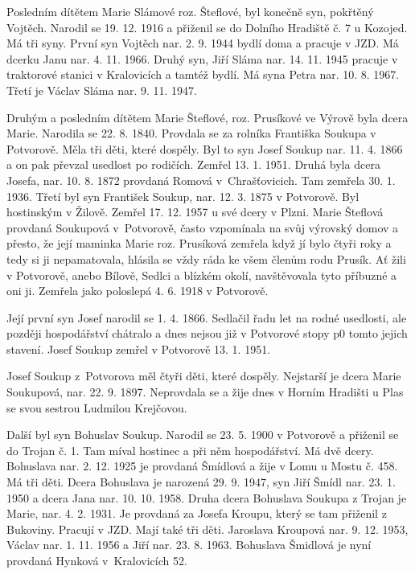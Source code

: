 \documentclass[../dejiny-rodu-prusiku.tex]{subfiles}
\begin{document}
Posledním dítětem Marie Slámové roz. Šteflové, byl konečně syn, pokřtěný Vojtěch. Narodil se 19. 12. 1916 a přiženil se do Dolního Hradiště č. 7 u Kozojed. Má tři syny. První syn Vojtěch nar. 2. 9. 1944 bydlí doma a pracuje v JZD. Má dcerku Janu nar. 4. 11. 1966. Druhý syn, Jiří Sláma nar. 14. 11. 1945 pracuje v traktorové stanici v Kralovicích a tamtéž bydlí. Má syna Petra nar. 10. 8. 1967. Třetí je Václav Sláma nar. 9. 11. 1947.

Druhým a posledním dítětem Marie Šteflové, roz. Prusíkové ve Výrově byla dcera Marie. Narodila se 22. 8. 1840. Provdala se za rolníka Františka Soukupa v Potvorově. Měla tři děti, které dospěly. Byl to syn Josef Soukup nar. 11. 4. 1866 a on pak převzal usedlost po rodičích. Zemřel 13. 1. 1951. Druhá byla dcera Josefa, nar. 10. 8. 1872 provdaná Romová v Chrašťovicich. Tam zemřela 30. 1. 1936. Třetí byl syn František Soukup, nar. 12. 3. 1875 v Potvorově. Byl hostinským v Žilově. Zemřel 17. 12. 1957 u své dcery v Plzni. Marie Šteflová provdaná Soukupová v Potvorově, často vzpomínala na svůj výrovský domov a přesto, že její maminka Marie roz. Prusíková zemřela když jí bylo čtyři roky a tedy si ji nepamatovala, hlásila se vždy ráda ke všem členům rodu Prusík. Ať žili v Potvorově, anebo Bílově, Sedlci a blízkém okolí, navštěvovala tyto příbuzné a oni ji. Zemřela jako poloslepá 4. 6. 1918 v Potvorově.

Její první syn Josef narodil se 1. 4. 1866. Sedlačil řadu let na rodné usedlosti, ale později hospodářství chátralo a dnes nejsou již v Potvorové stopy p0 tomto jejich stavení. Josef Soukup zemřel v Potvorově 13. 1. 1951.

Josef Soukup z Potvorova měl čtyři děti, které dospěly. Nejstarší je dcera Marie Soukupová, nar. 22. 9. 1897. Neprovdala se a žije dnes v Horním Hradišti u Plas se svou sestrou Ludmilou Krejčovou.

Další byl syn Bohuslav Soukup. Narodil se 23. 5. 1900 v Potvorově a přiženil se do Trojan č. 1. Tam míval hostinec a při něm hospodářství. Má dvě dcery. Bohuslava nar. 2. 12. 1925 je provdaná Šmídlová a žije v Lomu u Mostu č. 458. Má tři děti. Dcera Bohuslava je narozená 29. 9. 1947, syn Jiří Šmídl nar. 23. 1. 1950 a dcera Jana nar. 10. 10. 1958. Druha dcera Bohuslava Soukupa z Trojan je Marie, nar. 4. 2. 1931. Je provdaná za Josefa Kroupu, který se tam přiženil z Bukoviny. Pracují v JZD. Mají také tři děti. Jaroslava Kroupová nar. 9. 12. 1953, Václav nar. 1. 11. 1956 a Jiří nar. 23. 8. 1963. Bohuslava Šmidlová je nyní provdaná Hynková v Kralovicích 52.
\end{document}
